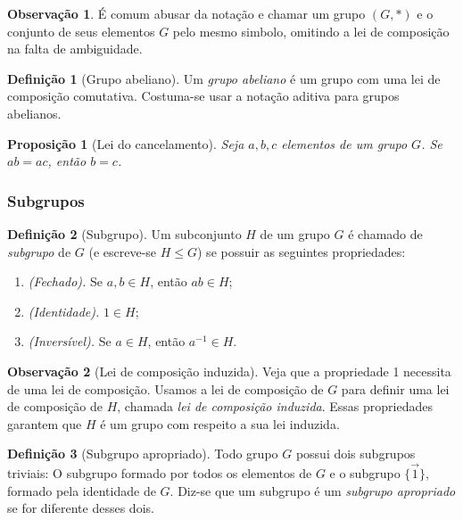 \documentclass[a4paper,12pt]{report}
\theoremstyle{plain}
\newtheorem{proposicao}{Proposição}[section]
\theoremstyle{definition}
\newtheorem{definicao}{Definição}[section]
\newtheorem{observacao}{Observação}[section]
\begin{document}
	\begin{observacao}
		É comum abusar da notação e chamar um grupo $(G,*)$ e o conjunto de	seus elementos $G$ pelo mesmo simbolo, omitindo a lei de composição na falta de ambiguidade.	
	\end{observacao}
	
	\begin{definicao}[Grupo abeliano]
		Um \emph{grupo abeliano} é um grupo com uma lei de
		composição comutativa. Costuma-se usar a notação aditiva para grupos
		abelianos.
	\end{definicao}
	
	\begin{proposicao}[Lei do cancelamento]
		Seja \(a,b,c\) elementos de um grupo \(G\). Se \(ab = ac\), então \(b = c\).
	\end{proposicao} 
	
	\subsubsection{Subgrupos}
	
	\begin{definicao}[Subgrupo]
		Um subconjunto \(H\) de um grupo \(G\) é chamado de \emph{subgrupo} de \(G\) (e escreve-se $H \leq G$) se possuir as seguintes propriedades:
		
		\begin{enumerate}
			\item \emph{(Fechado).} Se \(a,b\in H\), então \(ab\in H\);
			\item \emph{(Identidade).} \(1\in H\);
			\item \emph{(Inversível).} Se \(a\in H\), então \(a^{-1}\in H\).
		\end{enumerate}
		
	\end{definicao}
	
	\begin{observacao}[Lei de composição induzida]
		Veja que a propriedade 1 necessita de uma lei de composição. Usamos a
		lei de composição de \(G\) para definir uma lei de composição de \(H\),
		chamada \emph{lei de composição induzida}. Essas propriedades garantem
		que \(H\) é um grupo com respeito a sua lei induzida.
	\end{observacao}
	
	\begin{definicao}[Subgrupo apropriado]
		Todo grupo \(G\) possui dois subgrupos triviais: O subgrupo formado por
		todos os elementos de \(G\) e o subgrupo \(\{\vec{1}\}\), formado pela
		identidade de \(G\). Diz-se que um subgrupo é um \emph{subgrupo apropriado} se for diferente desses dois.
	\end{definicao}
	
\end{document}
